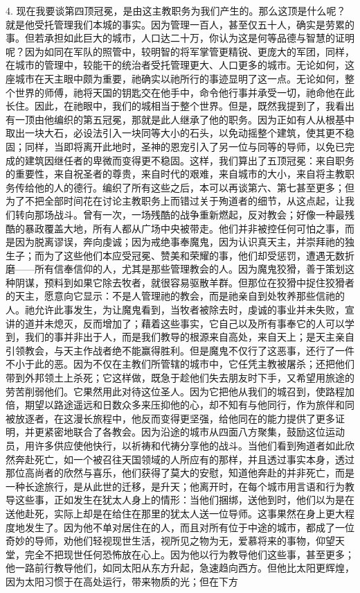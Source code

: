 4. 现在我要谈第四顶冠冕，是由这主教职务为我们产生的。那么这顶是什么呢？就是他受托管理我们本城的事实。因为管理一百人，甚至仅五十人，确实是劳累的事。但若承担如此巨大的城市，人口达二十万，你认为这是何等品德与智慧的证明呢？因为如同在军队的照管中，较明智的将军掌管更精锐、更庞大的军团，同样，在城市的管理中，较能干的统治者受托管理更大、人口更多的城市。无论如何，这座城市在天主眼中颇为重要，祂确实以祂所行的事迹显明了这一点。无论如何，整个世界的师傅，祂将天国的钥匙交在他手中，命令他行事并承受一切，祂命他在此长住。因此，在祂眼中，我们的城相当于整个世界。但是，既然我提到了，我看出有一顶由他编织的第五冠冕，那就是此人继承了他的职务。因为正如有人从根基中取出一块大石，必设法引入一块同等大小的石头，以免动摇整个建筑，使其更不稳固；同样，当即将离开此地时，圣神的恩宠引入了另一位与同等的导师，以免已完成的建筑因继任者的卑微而变得更不稳固。这样，我们算出了五顶冠冕：来自职务的重要性，来自祝圣者的尊贵，来自时代的艰难，来自城市的大小，来自将主教职务传给他的人的德行。编织了所有这些之后，本可以再谈第六、第七甚至更多；但为了不把全部时间花在讨论主教职务上而错过关于殉道者的细节，从这点起，让我们转向那场战斗。曾有一次，一场残酷的战争重新燃起，反对教会；好像一种最残酷的暴政覆盖大地，所有人都从广场中央被带走。他们并非被控任何可怕之事，而是因为脱离谬误，奔向虔诚；因为戒绝事奉魔鬼，因为认识真天主，并崇拜祂的独生子；而为了这些他们本应受冠冕、赞美和荣耀的事，他们却受惩罚，遭遇无数折磨——所有信奉信仰的人，尤其是那些管理教会的人。因为魔鬼狡猾，善于策划这种阴谋，预料到如果它除去牧者，就很容易驱散羊群。但那位在狡猾中捉住狡猾者的天主，愿意向它显示：不是人管理祂的教会，而是祂亲自到处牧养那些信祂的人。祂允许此事发生，为让魔鬼看到，当牧者被除去时，虔诚的事业并未失败，宣讲的道并未熄灭，反而增加了；藉着这些事实，它自己以及所有事奉它的人可以学到，我们的事并非出于人，而是我们教导的根源来自高处，来自天上；是天主亲自引领教会，与天主作战者绝不能赢得胜利。但是魔鬼不仅行了这恶事，还行了一件不小于此的恶。因为不仅在主教们所管辖的城市中，它任凭主教被屠杀；还把他们带到外邦领土上杀死；它这样做，既急于趁他们失去朋友时下手，又希望用旅途的劳苦削弱他们。它果然用此对待这位圣人。因为它把他从我们的城召到，使路程加倍，期望以路途遥远和日数众多来压抑他的心，却不知有与他同行，作为旅伴和同被放逐者，在这漫长旅程中，他反而变得更坚强，给他同在的能力提供了更多证明，并更紧密地联合了各教会。因为沿途的城市从四面八方聚集，鼓励这位运动员，用许多供应使他快行，以祈祷和代祷分享他的战斗。当他们看到殉道者如此欣然奔赴死亡，如一个被召往天国领域的人所应有的那样，并且透过事实本身，透过那位高尚者的欣然与喜乐，他们获得了莫大的安慰，知道他奔赴的并非死亡，而是一种长途旅行，是从此世的迁移，是升天；他离开时，在每个城市用言语和行为教导这些事，正如发生在犹太人身上的情形：当他们捆绑，送他到时，他们以为是在送他赴死，实际上却是在给住在那里的犹太人送一位导师。这事果然在身上更大程度地发生了。因为他不单对居住在的人，而且对所有位于中途的城市，都成了一位奇妙的导师，劝他们轻视现世生活，视所见之物为无，爱慕将来的事物，仰望天堂，完全不把现世任何恐怖放在心上。因为他以行为教导他们这些事，甚至更多；他一路前行教导他们，如同太阳从东方升起，急速趋向西方。但他比太阳更辉煌，因为太阳习惯于在高处运行，带来物质的光；但在下方